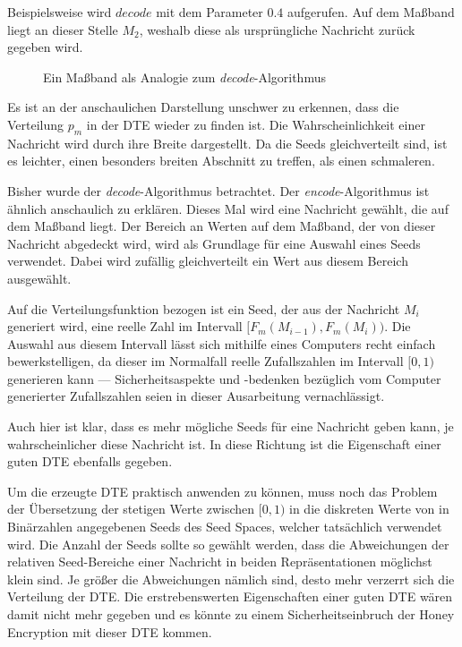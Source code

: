 Beispielsweise wird $decode$ mit dem Parameter $0.4$ aufgerufen. Auf dem Maßband liegt an dieser Stelle $M_2$, weshalb diese als ursprüngliche Nachricht zurück gegeben wird.

\begin{figure}[!h]
\center
{}
\caption{Ein Maßband als Analogie zum \emph{decode}-Algorithmus}
\label{fig:decode}
\end{figure}

Es ist an der anschaulichen Darstellung unschwer zu erkennen, dass die Verteilung $p_m$ in der DTE wieder zu finden ist. Die Wahrscheinlichkeit einer Nachricht wird durch ihre Breite dargestellt. Da die Seeds gleichverteilt sind, ist es leichter, einen besonders breiten Abschnitt zu treffen, als einen schmaleren.

Bisher wurde der \emph{decode}-Algorithmus betrachtet. Der \emph{encode}-Algorithmus ist ähnlich anschaulich zu erklären. Dieses Mal wird eine Nachricht gewählt, die auf dem Maßband liegt. Der Bereich an Werten auf dem Maßband, der von dieser Nachricht abgedeckt wird, wird als Grundlage für eine Auswahl eines Seeds verwendet. Dabei wird zufällig gleichverteilt ein Wert aus diesem Bereich ausgewählt.

Auf die Verteilungsfunktion bezogen ist ein Seed, der aus der Nachricht $M_i$ generiert wird, eine reelle Zahl im Intervall $[F_m(M_{i-1}), F_m(M_i))$. Die Auswahl aus diesem Intervall lässt sich mithilfe eines Computers recht einfach bewerkstelligen, da dieser im Normalfall reelle Zufallszahlen im Intervall $[0,1)$ generieren kann --- Sicherheitsaspekte und -bedenken bezüglich vom Computer generierter Zufallszahlen seien in dieser Ausarbeitung vernachlässigt.

Auch hier ist klar, dass es mehr mögliche Seeds für eine Nachricht geben kann, je wahrscheinlicher diese Nachricht ist. In diese Richtung ist die Eigenschaft einer guten DTE ebenfalls gegeben.

Um die erzeugte DTE praktisch anwenden zu können, muss noch das Problem der Übersetzung der stetigen Werte zwischen $[0,1)$ in die diskreten Werte von in Binärzahlen angegebenen Seeds des Seed Spaces, welcher tatsächlich verwendet wird. Die Anzahl der Seeds sollte so gewählt werden, dass die Abweichungen der relativen Seed-Bereiche einer Nachricht in beiden Repräsentationen möglichst klein sind. Je größer die Abweichungen nämlich sind, desto mehr verzerrt sich die Verteilung der DTE. Die erstrebenswerten Eigenschaften einer guten DTE wären damit nicht mehr gegeben und es könnte zu einem Sicherheitseinbruch der Honey Encryption mit dieser DTE kommen.